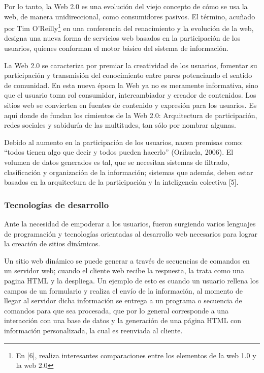 Por lo tanto, la Web 2.0 es una evolución del viejo concepto de cómo se usa la web, de manera
unidireccional, como consumidores pasivos. El término, acuñado por Tim O'Reilly\footnote{En [6], realiza interesantes 
comparaciones entre los elementos de la web 1.0 y la web 2.0} en una conferencia del renacimiento y la evolución de la web, 
designa una nueva forma de servicios web basados en la participación de los usuarios, quienes conforman el motor básico del 
sistema de información.

La Web 2.0 se caracteriza por premiar la creatividad de los usuarios, fomentar su participación y transmisión del conocimiento 
entre pares potenciando el sentido de comunidad. En esta nueva época la Web ya no es meramente informativa, sino que 
el usuario toma rol consumidor, intercambiador y creador de contenidos. Los sitios web se convierten en fuentes de contenido y expresión
para los usuarios. Es aquí donde de fundan los cimientos de la Web 2.0: Arquitectura de participación, redes sociales y 
sabiduría de las multitudes, tan sólo por nombrar algunas.

Debido al aumento en la participación de los usuarios, nacen premisas como: “todos tienen algo que decir y todos pueden hacerlo” 
(Orihuela, 2006). El volumen de datos generados es tal, que se necesitan sistemas de filtrado, clasificación y 
organización de la información; sistemas que además, deben estar basados en la arquitectura de la participación y la inteligencia 
colectiva [5].


\subsubsection{Tecnologías de desarrollo}
Ante la necesidad de empoderar a los usuarios, fueron surgiendo varios lenguajes de programación y tecnologías orientadas
al desarrollo web necesarios para lograr la creación de sitios dinámicos.

Un sitio web dinámico se puede generar a través de secuencias de comandos en un servidor web; cuando el cliente web recibe la 
respuesta, la trata como una pagina HTML y la despliega. Un ejemplo de esto es cuando un usuario rellena los campos de un formulario y
realiza el envío de la información, al momento de llegar al servidor dicha información se entrega a un programa o secuencia de comandos
para que sea procesada, que por lo general corresponde a una interacción con una base de datos y la generación de una página HTML
con información personalizada, la cual es reenviada al cliente.

